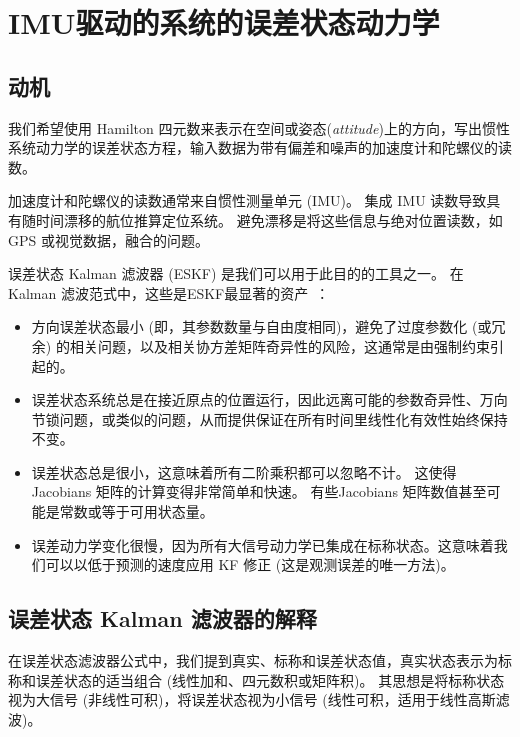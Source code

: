 

\section{IMU驱动的系统的误差状态动力学}
\label{sec:es-kinematics}

\subsection{动机}

我们希望使用 Hamilton 四元数来表示在空间或姿态(\emph{attitude})上的方向，写出惯性系统动力学的误差状态方程，输入数据为带有偏差和噪声的加速度计和陀螺仪的读数。

加速度计和陀螺仪的读数通常来自惯性测量单元 (IMU)。
集成 IMU 读数导致具有随时间漂移的航位推算定位系统。
避免漂移是将这些信息与绝对位置读数，如 GPS 或视觉数据，融合的问题。

误差状态 Kalman 滤波器 (ESKF) 是我们可以用于此目的的工具之一。 
在 Kalman 滤波范式中，这些是ESKF最显著的资产~\citep{MADYASTHA-11}：

\begin{itemize}
\item 方向误差状态最小 (即，其参数数量与自由度相同)，避免了过度参数化 (或冗余) 的相关问题，以及相关协方差矩阵奇异性的风险，这通常是由强制约束引起的。
\item 误差状态系统总是在接近原点的位置运行，因此远离可能的参数奇异性、万向节锁问题，或类似的问题，从而提供保证在所有时间里线性化有效性始终保持不变。
\item 误差状态总是很小，这意味着所有二阶乘积都可以忽略不计。 
这使得 Jacobians 矩阵的计算变得非常简单和快速。 
有些Jacobians 矩阵数值甚至可能是常数或等于可用状态量。
\item 误差动力学变化很慢，因为所有大信号动力学已集成在标称状态。这意味着我们可以以低于预测的速度应用 KF 修正 (这是观测误差的唯一方法)。
\end{itemize}


\subsection{误差状态 Kalman 滤波器的解释}

在误差状态滤波器公式中，我们提到真实、标称和误差状态值，真实状态表示为标称和误差状态的适当组合 (线性加和、四元数积或矩阵积)。 
其思想是将标称状态视为大信号 (非线性可积)，将误差状态视为小信号 (线性可积，适用于线性高斯滤波)。

